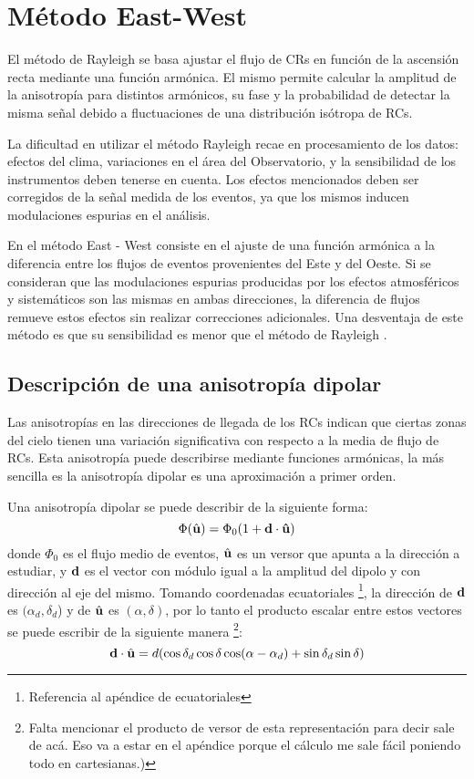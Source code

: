 
\chapter{Método East-West}

El método de Rayleigh se basa ajustar el flujo de CRs en función de la ascensión recta mediante una función armónica. El mismo permite calcular la amplitud de la anisotropía para distintos armónicos, su fase y la probabilidad de detectar la misma señal debido a fluctuaciones de una distribución isótropa de RCs. 

La dificultad en utilizar el método Rayleigh recae en procesamiento de los datos: efectos del clima,  variaciones en el área del Observatorio, y la sensibilidad de los instrumentos deben tenerse en cuenta.  Los efectos mencionados deben ser corregidos de la señal medida de los eventos, ya que los mismos inducen modulaciones espurias en el análisis.

En el método East - West consiste en el ajuste de una función armónica a la diferencia entre los flujos de eventos provenientes del Este y del Oeste. Si se consideran que las modulaciones espurias producidas por los efectos atmosféricos y sistemáticos son las mismas en ambas direcciones, la diferencia de flujos remueve estos efectos sin realizar correcciones adicionales. Una desventaja de este método es que su sensibilidad es menor que el método de Rayleigh \cite{taborda}.


\section{Descripción de una anisotropía dipolar}
Las anisotropías en las direcciones de llegada de los RCs indican que ciertas zonas del cielo tienen una variación significativa con respecto a la media de flujo de RCs. Esta anisotropía puede describirse mediante funciones armónicas, la más sencilla es la anisotropía dipolar es una aproximación a primer orden.

Una anisotropía dipolar se puede describir de la siguiente forma:
\begin{equation}
    \Phi(\hat{\bf{u}}) = \Phi_0(1+\bf{d}\cdot\hat{\bf{u}})
    \label{eq:dipolo_general}
\end{equation}
\noindent donde $\Phi_0$ es el flujo medio de eventos, $\hat{\bf{u}}$ es un versor que apunta a la dirección a estudiar, y $\bf{d}$ es el vector con módulo igual a la amplitud del dipolo y con dirección al eje del mismo. Tomando coordenadas ecuatoriales \footnote{Referencia al apéndice de ecuatoriales}, la dirección de $\bf{d}$ es $(\alpha_d, \delta_d$) y  de $\hat{\bf{u}}$ es $(\alpha, \delta)$, por lo tanto  el producto escalar  entre estos vectores se puede escribir de la siguiente manera \footnote{Falta mencionar el producto de versor de esta representación para decir sale de acá. Eso va a estar en el apéndice porque el cálculo me  sale fácil poniendo  todo en cartesianas.)}:
\begin{equation}
    \textbf{d}\cdot\hat{\bf{u}}= d (\cos\delta_d \cos\delta \cos(\alpha - \alpha_d) + \sin\delta_d  \sin\delta)
    \label{eq:product_ud}
\end{equation}


